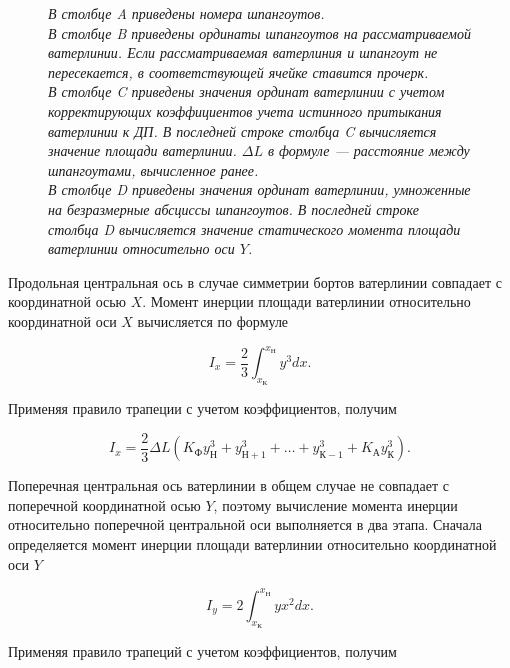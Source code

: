 \begin{figure}
    \caption{Схема расчета площади ватерлинии и статического момента площади ватерлинии от осадки в табличном редакторе}
    \caption*{
        \textit{
        В столбце A приведены номера шпангоутов.\\
        В столбце B приведены ординаты шпангоутов на рассматриваемой ватерлинии.
        Если рассматриваемая ватерлиния и шпангоут не пересекается, в соответствующей ячейке ставится прочерк.\\
        В столбце C приведены значения ординат ватерлинии с учетом корректирующих коэффициентов учета истинного притыкания ватерлинии к ДП.
        В последней строке столбца C вычисляется значение площади ватерлинии.
        $ \Delta L$ в формуле --- расстояние между шпангоутами, вычисленное ранее.\\
        В столбце D приведены значения ординат ватерлинии, умноженные на безразмерные абсциссы шпангоутов.
        В последней строке столбца D вычисляется значение статического момента площади ватерлинии относительно оси $Y$.}
        }
    \label{tab:waterline-elements}
\end{figure}

Продольная центральная ось в случае симметрии бортов ватерлинии совпадает с координатной осью $X$.
Момент инерции площади ватерлинии относительно координатной оси $X$ вычисляется по формуле

\begin{equation}
    I_x = \frac{2}{3} \int_{x_{\text{К}}}^{x_{\text{Н}}} y^3 dx.
\end{equation}

Применяя правило трапеции с учетом коэффициентов, получим

\begin{equation}
    I_x = \frac{2}{3} \Delta L (K_{\text{Ф}} y_{\text{Н}}^3 + y_{\text{Н}+1}^3 + \dots + y_{\text{К}-1}^3 + K_{\text{А}} y_{\text{К}}^3).
\end{equation}

Поперечная центральная ось ватерлинии в общем случае не совпадает с поперечной координатной осью $Y$, поэтому вычисление момента инерции относительно поперечной центральной оси выполняется в два этапа.
Сначала определяется момент инерции площади ватерлинии относительно координатной оси $Y$

\begin{equation}
    I_y = 2 \int_{x_{\text{К}}}^{x_{\text{Н}}} y x^2 dx.
\end{equation}

Применяя правило трапеций с учетом коэффициентов, получим

